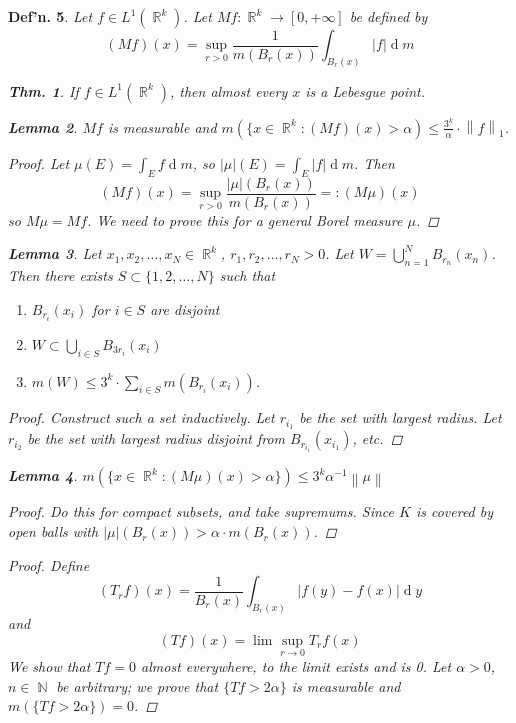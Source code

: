 \documentclass[12pt, a4paper]{book}
\DeclareMathOperator{\N}{\mathbb{N}}
\DeclareMathOperator{\R}{\mathbb{R}}
\renewcommand{\d}[1]{\ensuremath{\operatorname{d}\!{#1}}} %
\newcommand{\norm}[1]{\left\lVert#1\right\rVert} %
\newtheorem{theorem}{Thm.}[section]
\newtheorem{lemma}[theorem]{Lemma}
\newtheorem{definition}[theorem]{Def'n.}
\theoremstyle{nonumberplain}
\newtheorem{proof}{Proof}
\begin{document}
\begin{definition}
    Let $f\in L^1(\R^k)$.
    Let $Mf:\R^k\to[0,+\infty]$ be defined by
    \[(Mf)(x)=\sup_{r>0}\frac{1}{m(B_r(x))}\int_{B_r(x)}|f|\d{m}\]
\begin{theorem}
    If $f\in L^1(\R^k)$, then almost every $x$ is a Lebesgue point.
\end{theorem}
\begin{lemma}
    $Mf$ is measurable and $m(\{x\in\R^k:(Mf)(x)>\alpha)\leq\frac{3^k}{\alpha}\cdot\norm{f}_1$.
\end{lemma}
\begin{proof}
    Let $\mu(E)=\int_E f\d{m}$, so $|\mu|(E)=\int_E |f|\d{m}$.
    Then
    \[(Mf)(x)=\sup_{r>0}\frac{|\mu|(B_r(x))}{m(B_r(x))}=:(M\mu)(x)\]
    so $M\mu=Mf$.
    We need to prove this for a general Borel measure $\mu$.
\end{proof}
\begin{lemma}
    Let $x_1,x_2,\ldots,x_N\in\R^k$, $r_1,r_2,\ldots,r_N>0$.
    Let $W=\bigcup_{n=1}^N B_{r_n}(x_n)$.
    Then there exists $S\subset\{1,2,\ldots,N\}$ such that
    \begin{enumerate}[nolistsep]
        \item $B_{r_i}(x_i)$ for $i\in S$ are disjoint
        \item $W\subset\bigcup_{i\in S}B_{3r_i}(x_i)$
        \item $m(W)\leq 3^k\cdot\sum_{i\in S}m(B_{r_i}(x_i))$.
    \end{enumerate}
\end{lemma}
\begin{proof}
    Construct such a set inductively.
    Let $r_{i_1}$ be the set with largest radius.
    Let $r_{i_2}$ be the set with largest radius disjoint from $B_{r_{i_1}}(x_{i_1})$, etc.
\end{proof}
\begin{lemma}
    $m(\{x\in \R^k:(M\mu)(x)>\alpha\})\leq 3^k\alpha^{-1}\norm{\mu}$
\end{lemma}
\begin{proof}
    Do this for compact subsets, and take supremums.
    Since $K$ is covered by open balls with $|\mu|(B_r(x))>\alpha\cdot m(B_r(x))$.
\end{proof}
\begin{proof}
    Define
    \[(T_rf)(x)=\frac{1}{B_r(x)}\int_{B_r(x)}|f(y)-f(x)|\d{y}\]
    and
    \[(Tf)(x)=\lim\sup_{r\to 0}T_rf(x)\]
    We show that $Tf=0$ almost everywhere, to the limit exists and is 0.
    Let $\alpha>0$, $n\in\N$ be arbitrary; we prove that $\{Tf>2\alpha\}$ is measurable and $m(\{Tf>2\alpha\})=0$.

\end{proof}
\end{definition}
\end{document}

